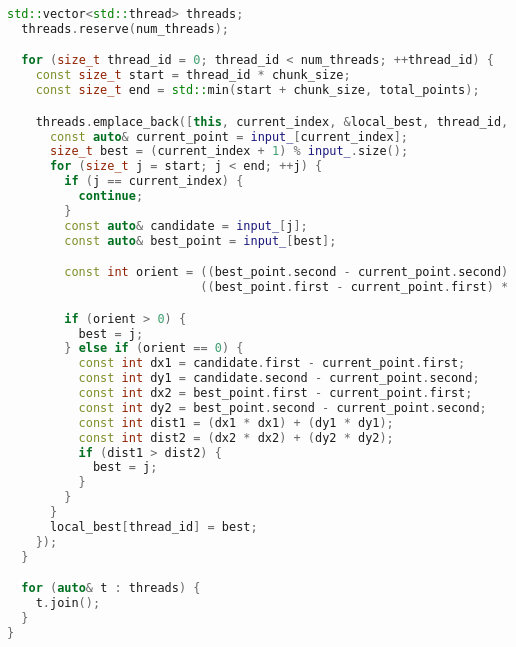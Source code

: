 \documentclass[a4paper,12pt]{article}
\begin{document}
\begin{itemize}
\begin{lstlisting}[language=C++]
  std::vector<std::thread> threads;
  threads.reserve(num_threads);

  for (size_t thread_id = 0; thread_id < num_threads; ++thread_id) {
    const size_t start = thread_id * chunk_size;
    const size_t end = std::min(start + chunk_size, total_points);

    threads.emplace_back([this, current_index, &local_best, thread_id, start, end]() {
      const auto& current_point = input_[current_index];
      size_t best = (current_index + 1) % input_.size();
      for (size_t j = start; j < end; ++j) {
        if (j == current_index) {
          continue;
        }
        const auto& candidate = input_[j];
        const auto& best_point = input_[best];

        const int orient = ((best_point.second - current_point.second) * (candidate.first - best_point.first)) -
                           ((best_point.first - current_point.first) * (candidate.second - best_point.second));

        if (orient > 0) {
          best = j;
        } else if (orient == 0) {
          const int dx1 = candidate.first - current_point.first;
          const int dy1 = candidate.second - current_point.second;
          const int dx2 = best_point.first - current_point.first;
          const int dy2 = best_point.second - current_point.second;
          const int dist1 = (dx1 * dx1) + (dy1 * dy1);
          const int dist2 = (dx2 * dx2) + (dy2 * dy2);
          if (dist1 > dist2) {
            best = j;
          }
        }
      }
      local_best[thread_id] = best;
    });
  }

  for (auto& t : threads) {
    t.join();
  }
}
\end{lstlisting}
\end{itemize}
\end{document}
